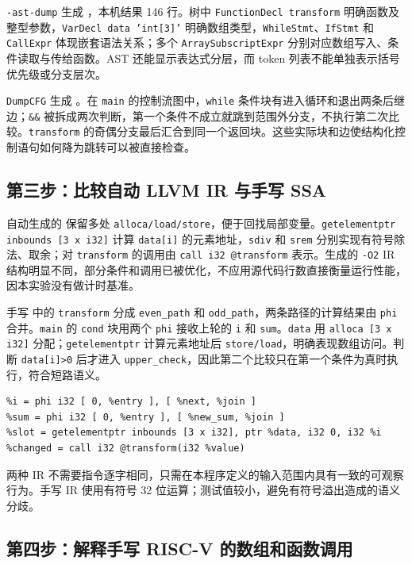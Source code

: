 \documentclass[UTF8,a4paper,12pt]{ctexart}
\begin{document}
\texttt{-ast-dump} 生成 ，本机结果 146 行。树中 \texttt{FunctionDecl transform} 明确函数及整型参数，\texttt{VarDecl data 'int[3]'} 明确数组类型，\texttt{WhileStmt}、\texttt{IfStmt} 和 \texttt{CallExpr} 体现嵌套语法关系；多个 \texttt{ArraySubscriptExpr} 分别对应数组写入、条件读取与传给函数。AST 还能显示表达式分层，而 token 列表不能单独表示括号优先级或分支层次。

\texttt{DumpCFG} 生成 。在 \texttt{main} 的控制流图中，\texttt{while} 条件块有进入循环和退出两条后继边；\texttt{\&\&} 被拆成两次判断，第一个条件不成立就跳到范围外分支，不执行第二次比较。\texttt{transform} 的奇偶分支最后汇合到同一个返回块。这些实际块和边使结构化控制语句如何降为跳转可以被直接检查。

\subsection{第三步：比较自动 LLVM IR 与手写 SSA}

自动生成的  保留多处 \texttt{alloca/load/store}，便于回找局部变量。\texttt{getelementptr inbounds [3 x i32]} 计算 \texttt{data[i]} 的元素地址，\texttt{sdiv} 和 \texttt{srem} 分别实现有符号除法、取余；对 \texttt{transform} 的调用由 \texttt{call i32 @transform} 表示。生成的 \texttt{-O2} IR 结构明显不同，部分条件和调用已被优化，不应用源代码行数直接衡量运行性能，因本实验没有做计时基准。

手写  中的 \texttt{transform} 分成 \texttt{even\_path} 和 \texttt{odd\_path}，两条路径的计算结果由 \texttt{phi} 合并。\texttt{main} 的 \texttt{cond} 块用两个 \texttt{phi} 接收上轮的 \texttt{i} 和 \texttt{sum}。\texttt{data} 用 \texttt{alloca [3 x i32]} 分配；\texttt{getelementptr} 计算元素地址后 \texttt{store/load}，明确表现数组访问。判断 \texttt{data[i]>0} 后才进入 \texttt{upper\_check}，因此第二个比较只在第一个条件为真时执行，符合短路语义。

\begin{lstlisting}
%i = phi i32 [ 0, %entry ], [ %next, %join ]
%sum = phi i32 [ 0, %entry ], [ %new_sum, %join ]
%slot = getelementptr inbounds [3 x i32], ptr %data, i32 0, i32 %i
%changed = call i32 @transform(i32 %value)
\end{lstlisting}

两种 IR 不需要指令逐字相同，只需在本程序定义的输入范围内具有一致的可观察行为。手写 IR 使用有符号 32 位运算；测试值较小，避免有符号溢出造成的语义分歧。

\subsection{第四步：解释手写 RISC-V 的数组和函数调用}
\end{document}
